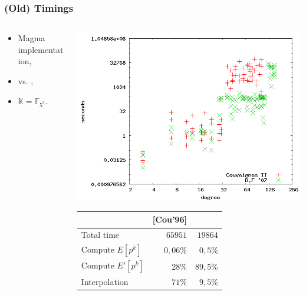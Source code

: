 \documentclass[10pt]{beamer}
\newcommand{\K}{\mathbb{K}}  %
\newcommand{\F}{\mathbb{F}}  %
\newcommand{\0}{\mathcal{O}}  %
\begin{document}
\begin{frame}
  \frametitle{(Old) Timings}

  \begin{columns}
    \begin{column}{0.4\textwidth}
      \begin{itemize}
      \item Magma implementation,
      \item \cite{Cou96} vs. \cite{DF07},
      \item $\K = \F_{5^3}$.
      \end{itemize}
    \end{column}
    \begin{column}{0.6\textwidth}
      \includegraphics[width=\textwidth]{5}

      \smallskip
      \footnotesize
      \centering
      \begin{tabular}{|l|r|r|}
        \hline
        & [Cou'96] & \cite{DF07}\\
        \hline
        
        Total time           &  $65951$ & $19864$\\
        Compute $E[p^k]$    &           $0,06$\% & $0,5$\%\\
        Compute $E'[p^k]$   &             $28$\% & $89,5$\%\\
        Interpolation &             $71$\% & $9,5$\%\\
        \hline
      \end{tabular}
    \end{column}
  \end{columns}
\end{frame}
\end{document}

